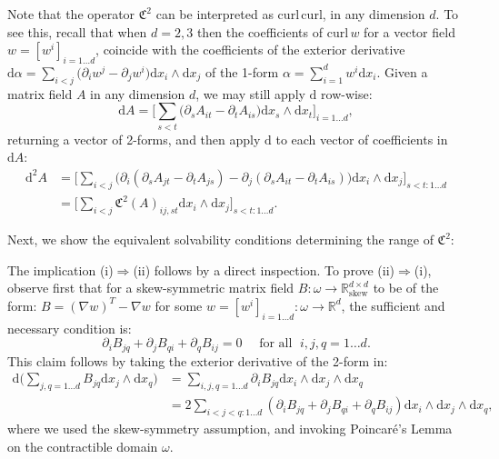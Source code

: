 \documentclass[reqno,twoside,11pt]{amsart}
\newcommand{\curl}{\mathrm{curl}}
\newcommand{\R}{\mathbb{R}}
\numberwithin{equation}{section}
\theoremstyle{plain}
\theoremstyle{definition}
\begin{document}
\smallskip

\noindent Note that the operator $\mathfrak{C}^2$ can be interpreted as $\curl\,\curl$, in any dimension $d$.
To see this, recall that when $d=2,3$ then the coefficients of $\curl \,w$ for a vector
field $w=[w^i]_{i=1\ldots d}$, coincide with the coefficients
of the exterior derivative $ \mathrm{d}\alpha =
\sum_{i<j}\big(\partial_iw^j-\partial_jw^i\big)\mathrm{d}x_i\wedge
\mathrm{d}x_j$ of the 1-form $\alpha=\sum_{i=1}^dw^i \mathrm{d}x_i$.
Given a matrix field $A$ in any dimension $d$, we may still apply $\mathrm{d}$ row-wise:
$$\mathrm{d}A=\Big[\sum_{s<t} \big(\partial_sA_{it} - \partial_tA_{is}\big)\mathrm{d}x_s\wedge
\mathrm{d}x_t\Big]_{i=1\ldots d},$$ 
returning a vector of 2-forms, and then apply $\mathrm{d}$ to each vector of coefficients in $\mathrm{d}A$:
\begin{equation*}
\begin{split}
\mathrm{d}^2A & = \Big[\sum_{i<j} \big(\partial_i(\partial_sA_{jt} - \partial_tA_{js})
- \partial_j(\partial_sA_{it} - \partial_tA_{is})\big) \mathrm{d}x_i\wedge
\mathrm{d}x_j\Big]_{s<t:1\ldots d} \\ & 
= \Big[\sum_{i<j} \mathfrak{C}^2(A)_{ij,st} \mathrm{d}x_i\wedge \mathrm{d}x_j \Big]_{s<t:1\ldots d}.
\end{split}
\end{equation*}

\medskip

\noindent Next, we show the equivalent solvability conditions
determining the range of $\mathfrak{C}^2$:

\smallskip


The implication (i)$\Rightarrow$(ii) follows by a direct
inspection. To prove (ii)$\Rightarrow$(i), observe first that for a
skew-symmetric matrix field $B:\omega\to\R^{d\times
  d}_{\mathrm{skew}}$ to be of the form: 
$B= (\nabla w)^T - \nabla w$ for some $w=[w^i]_{i=1\ldots d}:\omega\to\R^d$, the
sufficient and necessary condition is: 
\begin{equation}\label{tre}
\partial_iB_{jq} + \partial_jB_{qi}+\partial_qB_{ij} = 0\quad\mbox{ for all }\; i,j,q=1\ldots d.
\end{equation}
This claim follows by taking the exterior derivative of the 2-form in:
\begin{equation*}
\begin{split}
\mathrm{d}\big(\sum_{j,q=1\ldots d}B_{jq}\mathrm{d}x_j\wedge\mathrm{d}x_q\big)
& = \sum_{i,j,q=1\ldots d}\partial_i B_{jq}\mathrm{d}x_i\wedge \mathrm{d}x_j\wedge\mathrm{d}x_q
\\ & = 2\sum_{i<j<q:1\ldots d}(\partial_i B_{jq} + \partial_jB_{qi}
+ \partial_qB_{ij})\mathrm{d}x_i\wedge \mathrm{d}x_j\wedge\mathrm{d}x_q,
\end{split}
\end{equation*}
where we used the skew-symmetry assumption, and invoking Poincar\'e's
Lemma on the contractible domain $\omega$.
\end{document}
